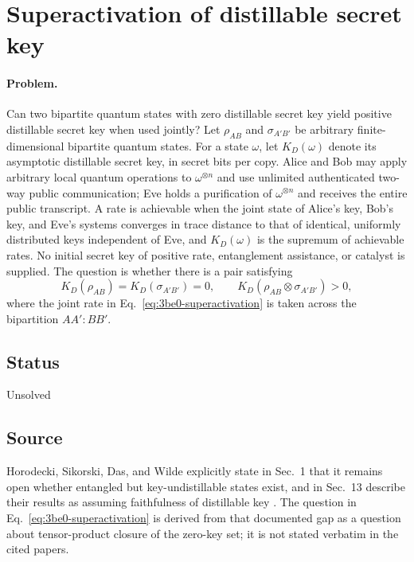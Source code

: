 \section{Superactivation of distillable secret key}
\label{sec:op_3be0df761e83d438}

\paragraph{Problem.}
Can two bipartite quantum states with zero distillable secret key yield
positive distillable secret key when used jointly?  Let $\rho_{AB}$ and
$\sigma_{A'B'}$ be arbitrary finite-dimensional bipartite quantum states.  For
a state $\omega$, let $K_D(\omega)$ denote its asymptotic distillable secret
key, in secret bits per copy.  Alice and Bob may apply arbitrary local quantum
operations to $\omega^{\otimes n}$ and use unlimited authenticated two-way
public communication; Eve holds a purification of $\omega^{\otimes n}$ and
receives the entire public transcript.  A rate is achievable when the joint
state of Alice's key, Bob's key, and Eve's systems converges in trace distance
to that of identical, uniformly distributed keys independent of Eve, and
$K_D(\omega)$ is the supremum of achievable rates.  No initial secret key of
positive rate, entanglement assistance, or catalyst is supplied.  The question
is whether there is a pair satisfying
\begin{equation}
  K_D(\rho_{AB})=K_D(\sigma_{A'B'})=0,
  \qquad
  K_D(\rho_{AB}\otimes\sigma_{A'B'})>0,
  \label{eq:3be0-superactivation}
\end{equation}
where the joint rate in Eq.~\eqref{eq:3be0-superactivation} is taken across
the bipartition $AA':BB'$.

\subsection*{Status}

Unsolved

\subsection*{Source}

Horodecki, Sikorski, Das, and Wilde explicitly state in Sec.~1 that it
remains open whether entangled but key-undistillable states exist, and in
Sec.~13 describe their results as assuming faithfulness of distillable key
.  The question in
Eq.~\eqref{eq:3be0-superactivation} is derived from that documented gap as a
question about tensor-product closure of the zero-key set; it is not stated
verbatim in the cited papers.

